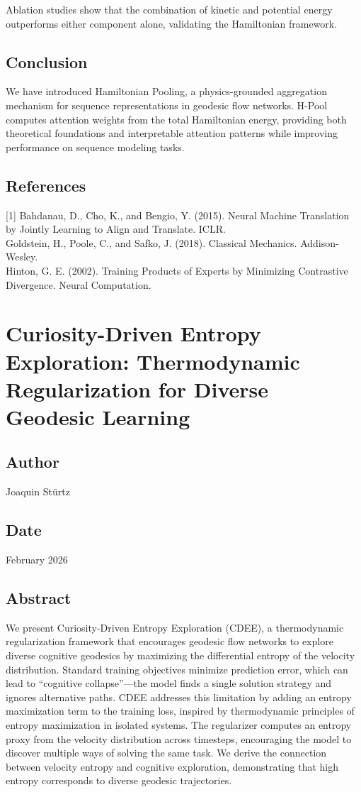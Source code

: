 Ablation studies show that the combination of kinetic and potential energy outperforms either component alone, validating the Hamiltonian framework.

\subsection{Conclusion}
We have introduced Hamiltonian Pooling, a physics-grounded aggregation mechanism for sequence representations in geodesic flow networks. H-Pool computes attention weights from the total Hamiltonian energy, providing both theoretical foundations and interpretable attention patterns while improving performance on sequence modeling tasks.

\subsection*{References}
[1] Bahdanau, D., Cho, K., and Bengio, Y. (2015). Neural Machine Translation by Jointly Learning to Align and Translate. ICLR.\\
[2] Goldstein, H., Poole, C., and Safko, J. (2018). Classical Mechanics. Addison-Wesley.\\
[3] Hinton, G. E. (2002). Training Products of Experts by Minimizing Contrastive Divergence. Neural Computation.

\section{Curiosity-Driven Entropy Exploration: Thermodynamic Regularization for Diverse Geodesic Learning}
\subsection*{Author}
Joaquin Stürtz
\subsection*{Date}
February 2026
\subsection*{Abstract}
We present Curiosity-Driven Entropy Exploration (CDEE), a thermodynamic regularization framework that encourages geodesic flow networks to explore diverse cognitive geodesics by maximizing the differential entropy of the velocity distribution. Standard training objectives minimize prediction error, which can lead to ``cognitive collapse''—the model finds a single solution strategy and ignores alternative paths. CDEE addresses this limitation by adding an entropy maximization term to the training loss, inspired by thermodynamic principles of entropy maximization in isolated systems. The regularizer computes an entropy proxy from the velocity distribution across timesteps, encouraging the model to discover multiple ways of solving the same task. We derive the connection between velocity entropy and cognitive exploration, demonstrating that high entropy corresponds to diverse geodesic trajectories.

